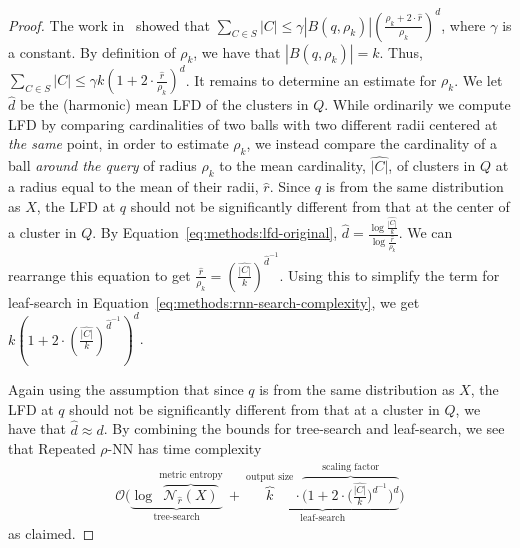 \begin{proof}
The work in~\cite{yu2015entropy} showed that $\sum_{C \in S} |C| \leq \gamma  \left| B(q, \rho_k) \right| \left(\frac{\rho_k + 2 \cdot \hat{r}}{\rho_k} \right)^d$, where $\gamma$ is a constant.
By definition of $\rho_k$, we have that $|B(q, \rho_k)| = k$.
Thus, $\sum_{C \in S} |C| \leq \gamma k \left( 1 + 2 \cdot \frac{\hat{r}}{\rho_k} \right)^d$.
It remains to determine an estimate for $\rho_k$.
We let $\hat{d}$ be the (harmonic) mean LFD of the clusters in $Q$.
While ordinarily we compute LFD by comparing cardinalities of two balls with two different radii centered at \textit{the same} point, in order to estimate $\rho_k$, we instead compare the cardinality of a ball \textit{around the query} of radius $\rho_k$ to the mean cardinality, $\hat{|C|}$, of clusters in $Q$ at a radius equal to the mean of their radii, $\hat{r}$.
Since $q$ is from the same distribution as $X$, the LFD at $q$ should not be significantly different from that at the center of a cluster in $Q$.
By Equation~\ref{eq:methods:lfd-original}, $\hat{d} = \frac{\log{}\frac{\hat{|C|}}{k}}{\log{}\frac{\hat{r}}{\rho_k}}$.
We can rearrange this equation to get $\frac{\hat{r}}{\rho_k} = \left( \frac{\hat{|C|}}{k} \right)^{\hat{d}^{-1}}$.
Using this to simplify the term for leaf-search in Equation~\ref{eq:methods:rnn-search-complexity}, we get $k \left( 1 + 2 \cdot \left( \frac{\hat{|C|}}{k} \right) ^ {\hat{d}^{-1}} \right)^d$.

Again using the assumption that since $q$ is from the same distribution as $X$, the LFD at $q$ should not be significantly different from that at a cluster in $Q$, we have that $\hat{d} \approx d$.
By combining the bounds for tree-search and leaf-search, we see that Repeated $\rho$-NN has time complexity
\begin{gather*}
    \mathcal{O}
    \Bigg(
        \underbrace{
            \log~\overbrace{\mathcal{N}_{\hat{r}}(X)}^{\textrm{metric entropy}}
        }_{\textrm{tree-search}}
        \ + \
        \underbrace{
            \overbrace{k}^{\textrm{output size}} \cdot
            \overbrace{\bigg( 1 + 2 \cdot \Big( \frac{\hat{|C|}}{k} \Big) ^ {d^{-1}} \bigg)^d}^{\textrm{scaling factor}}
        }_{\textrm{leaf-search}}
    \Bigg)
    \label{eq:methods:repeated-rnn-complexity}
\end{gather*}
as claimed. 
\end{proof}



